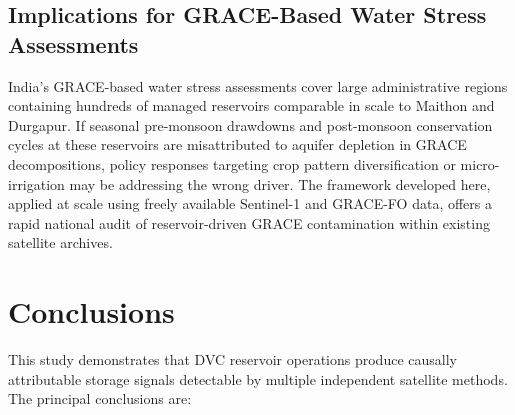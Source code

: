 \documentclass[preprint,12pt,authoryear]{elsarticle}
\begin{document}
\subsection{Implications for GRACE-Based Water Stress Assessments}
\label{sec:disc_implications}

India's GRACE-based water stress assessments \citep{Rodell2009,Long2020} cover
large administrative regions containing hundreds of managed reservoirs
comparable in scale to Maithon and Durgapur. If seasonal pre-monsoon drawdowns
and post-monsoon conservation cycles at these reservoirs are misattributed to
aquifer depletion in GRACE decompositions, policy responses targeting crop
pattern diversification or micro-irrigation may be addressing the wrong driver.
The framework developed here, applied at scale using freely available
Sentinel-1 and GRACE-FO data, offers a rapid national audit of
reservoir-driven GRACE contamination within existing satellite archives.

\section{Conclusions}
\label{sec:conc}

This study demonstrates that DVC reservoir operations produce causally
attributable storage signals detectable by multiple independent satellite
methods. The principal conclusions are:
\end{document}
